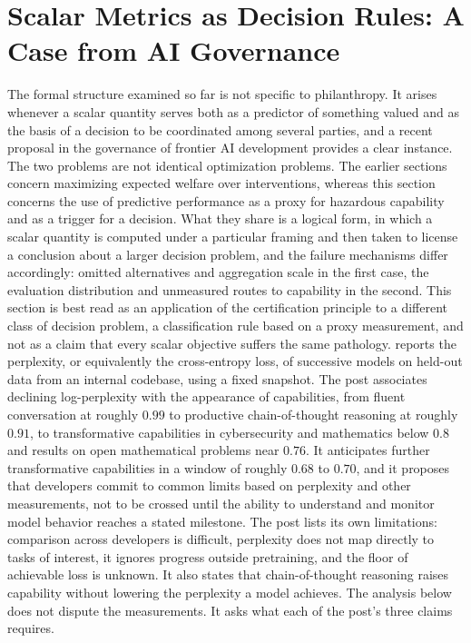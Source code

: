 \documentclass[11pt]{article}
\theoremstyle{definition}
\theoremstyle{remark}
\begin{document}
\section{Scalar Metrics as Decision Rules: A Case from AI Governance}
\label{sec:scalar}

The formal structure examined so far is not specific to philanthropy. It arises whenever a scalar quantity serves both as a predictor of something valued and as the basis of a decision to be coordinated among several parties, and a recent proposal in the governance of frontier AI development provides a clear instance. The two problems are not identical optimization problems. The earlier sections concern maximizing expected welfare over interventions, whereas this section concerns the use of predictive performance as a proxy for hazardous capability and as a trigger for a decision. What they share is a logical form, in which a scalar quantity is computed under a particular framing and then taken to license a conclusion about a larger decision problem, and the failure mechanisms differ accordingly: omitted alternatives and aggregation scale in the first case, the evaluation distribution and unmeasured routes to capability in the second. This section is best read as an application of the certification principle to a different class of decision problem, a classification rule based on a proxy measurement, and not as a claim that every scalar objective suffers the same pathology. \citet{pachocki2026} reports the perplexity, or equivalently the cross-entropy loss, of successive models on held-out data from an internal codebase, using a fixed snapshot. The post associates declining log-perplexity with the appearance of capabilities, from fluent conversation at roughly $0.99$ to productive chain-of-thought reasoning at roughly $0.91$, to transformative capabilities in cybersecurity and mathematics below $0.8$ and results on open mathematical problems near $0.76$. It anticipates further transformative capabilities in a window of roughly $0.68$ to $0.70$, and it proposes that developers commit to common limits based on perplexity and other measurements, not to be crossed until the ability to understand and monitor model behavior reaches a stated milestone. The post lists its own limitations: comparison across developers is difficult, perplexity does not map directly to tasks of interest, it ignores progress outside pretraining, and the floor of achievable loss is unknown. It also states that chain-of-thought reasoning raises capability without lowering the perplexity a model achieves. The analysis below does not dispute the measurements. It asks what each of the post's three claims requires.
\end{document}
